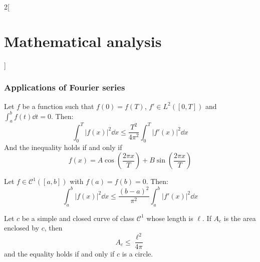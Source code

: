 \documentclass[../../../main.tex]{subfiles}
\begin{document}
\begin{multicols}{2}[\section{Mathematical analysis}]
  \subsubsection{Applications of Fourier series}
  \begin{theorem}
    Let $f$ be a function such that $f(0)=f(T)$, $f'\in L^2([0,T])$ and $\displaystyle\int_a^bf(t)\dd{t}=0$. Then: $$\int_0^T{|f(x)|}^2\dd{x}\leq\frac{T^2}{4\pi^2}\int_0^T{|f'(x)|}^2\dd{x}$$ And the inequality holds if and only if $$f(x)=A\cos\left(\frac{2\pi x}{T}\right)+B\sin\left(\frac{2\pi x}{T}\right)$$
  \end{theorem}
  \begin{theorem}
    Let $f\in \mathcal{C}^1([a,b])$ with $f(a)=f(b)=0$. Then: $$\int_a^b{|f(x)|}^2\dd{x}\leq\frac{{(b-a)}^2}{\pi^2}\int_a^b|f'(x)|^2\dd{x}$$
  \end{theorem}
  \begin{theorem}
    Let $c$ be a simple and closed curve of class $\mathcal{C}^1$ whose length is $\ell$. If $A_c$ is the area enclosed by $c$, then $$A_c\leq\frac{\ell^2}{4\pi}$$ and the equality holds if and only if $c$ is a circle.
  \end{theorem}
\end{multicols}
\end{document}
